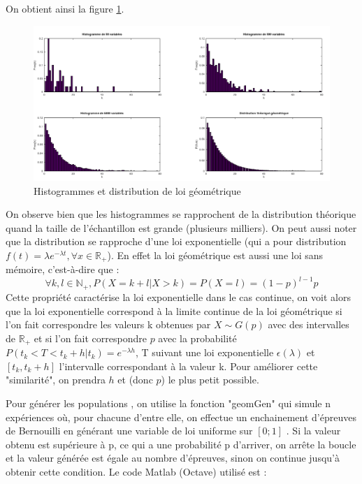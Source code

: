 \documentclass[12pt,a4paper,titlepage]{article}
\numberwithin{equation}{section}
\begin{document}


On obtient ainsi la figure \ref{Histogrammes et distribution de loi géométrique}.

\begin{figure}[!h]
\begin{center}
 \includegraphics[scale=0.4]{images/histGeom.png} 
\end{center}
 \caption{Histogrammes et distribution de loi géométrique}
 \label{Histogrammes et distribution de loi géométrique}
\end{figure}

On observe bien que les histogrammes se rapprochent de la distribution théorique quand
la taille de l'échantillon est grande (plusieurs milliers). On peut aussi noter que la distribution
se rapproche d'une loi exponentielle (qui a pour distribution $f(t)=\lambda e^{-\lambda t}, \forall x \in \mathbb{R}_{+}$). En effet la loi géométrique est aussi une loi sans mémoire, c'est-à-dire que :
\[\forall k,l \in \mathbb{N}_{+}, P(X=k+l|X>k) = P(X=l) = (1-p)^{l-1}p \]
Cette propriété caractérise la loi exponentielle dans le cas continue, on voit alors que la loi exponentielle correspond à la limite continue de la loi géométrique si l'on fait correspondre les valeurs k obtenues par $X\sim G(p)$ avec des intervalles de  $\mathbb{R}_{+}$ et si l'on fait correspondre $p$ avec la probabilité $P(t_{k}<T<t_{k}+h|t_{k})=e^{-\lambda h}$, T suivant une loi exponentielle $\epsilon(\lambda)$ et $[t_{k},t_{k}+h]$ l'intervalle correspondant à la valeur k. Pour améliorer cette "similarité", on prendra $h$ et (donc $p$) le plus petit possible.

Pour générer les populations , on utilise la fonction "geomGen" qui simule
n expériences où, pour chacune d'entre elle, on effectue un enchainement
d'épreuves de Bernouilli en générant une variable de loi uniforme sur
$[0;1]$ . Si la valeur obtenu est supérieure à p, ce qui a une probabilité p d'arriver, on arrête la boucle
et la valeur générée est égale au nombre d'épreuves, sinon on continue 
jusqu'à obtenir cette condition. Le code Matlab (Octave) utilisé est :
\end{document}
